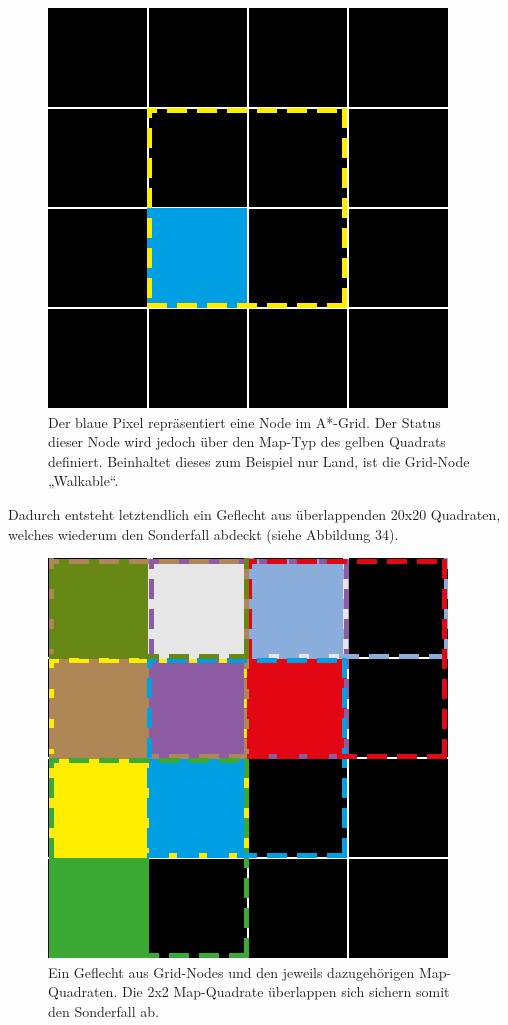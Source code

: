 \documentclass[a4paper,12pt]{article}
\begin{document}
\begin{figure}[H]
\centering
    \includegraphics[width=.8\linewidth]{Bilder/Aufgabe3/Teilaufgabe_A/AStar_Grid.png}
    \caption{Der blaue Pixel repräsentiert eine Node im A*-Grid. Der Status dieser Node wird jedoch über den Map-Typ des gelben Quadrats definiert. Beinhaltet dieses zum Beispiel nur Land, ist die Grid-Node „Walkable“.}
\end{figure}

Dadurch entsteht letztendlich ein Geflecht aus überlappenden 20x20 Quadraten, welches wiederum den Sonderfall abdeckt (siehe Abbildung 34).

\begin{figure}[H]
\centering
    \includegraphics[width=.8\linewidth]{Bilder/Aufgabe3/Teilaufgabe_A/AStar_Grid_02.png}
    \caption{Ein Geflecht aus Grid-Nodes und den jeweils dazugehörigen Map-Quadraten. Die 2x2 Map-Quadrate überlappen sich sichern somit den Sonderfall ab.}
\end{figure}
\end{document}
